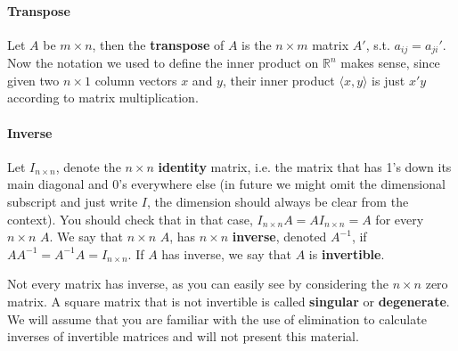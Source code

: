 \documentclass[12pt,oneside]{article}
\begin{document}
\paragraph{Transpose}
Let $A$ be $m \times n$, then the \textbf{transpose} of $A$ is
the $n \times m$ matrix $A'$, s.t. $a_{ij} = a_{ji}'$. Now the
notation we used to define the inner product on ${\mathbb{R}}^n$ makes
sense, since given two $n \times 1$ column vectors $x$ and $y$, their
inner product $\langle x, y \rangle$ is just $x'y$ according to matrix
multiplication.

\paragraph{Inverse}
Let $I_{n \times n}$, denote the $n \times n$ \textbf{identity}
matrix, i.e. the matrix that has 1's down its main diagonal and 0's
everywhere else (in future we might omit the dimensional subscript and
just write $I$, the dimension should always be clear from the
context). You should check that in that case, $I_{n \times n} A = A
I_{n \times n} = A$ for every $n \times n$ $A$. We say that $n \times
n$ $A$, has $n \times n$ \textbf{inverse}, denoted $A^{-1}$, if $A
A^{-1} = A^{-1} A = I_{n \times n}$.  If $A$ has inverse, we say that
$A$ is \textbf{invertible}. 

Not every matrix has inverse, as you can easily see by considering the $n \times n$ zero matrix. A square matrix 
that is not invertible is called \textbf{singular} or \textbf{degenerate}. We  will assume that you are familiar with the use of elimination to calculate
inverses of invertible matrices and will not present this material. 
\end{document}
